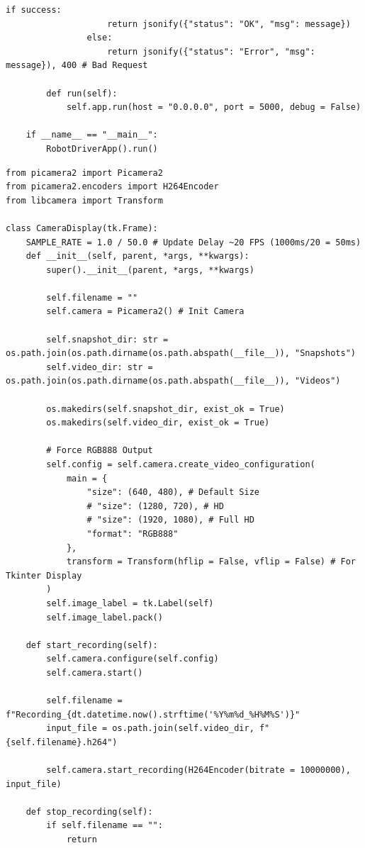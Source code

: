 \documentclass{article}
\begin{document}
\begin{lstlisting}[caption={Robot Driver App}, label={lst:driver_app_code}]
                if success:
                    return jsonify({"status": "OK", "msg": message})
                else:
                    return jsonify({"status": "Error", "msg": message}), 400 # Bad Request

        def run(self):
            self.app.run(host = "0.0.0.0", port = 5000, debug = False)

    if __name__ == "__main__":
        RobotDriverApp().run()
\end{lstlisting}


\begin{lstlisting}[caption={PiCamera Display}, label={lst:picamera_display_code}]
from picamera2 import Picamera2
from picamera2.encoders import H264Encoder
from libcamera import Transform

class CameraDisplay(tk.Frame):
    SAMPLE_RATE = 1.0 / 50.0 # Update Delay ~20 FPS (1000ms/20 = 50ms)
    def __init__(self, parent, *args, **kwargs):
        super().__init__(parent, *args, **kwargs)

        self.filename = ""
        self.camera = Picamera2() # Init Camera

        self.snapshot_dir: str = os.path.join(os.path.dirname(os.path.abspath(__file__)), "Snapshots")
        self.video_dir: str = os.path.join(os.path.dirname(os.path.abspath(__file__)), "Videos")

        os.makedirs(self.snapshot_dir, exist_ok = True)
        os.makedirs(self.video_dir, exist_ok = True)

        # Force RGB888 Output
        self.config = self.camera.create_video_configuration(
            main = {
                "size": (640, 480), # Default Size
                # "size": (1280, 720), # HD
                # "size": (1920, 1080), # Full HD
                "format": "RGB888"
            },
            transform = Transform(hflip = False, vflip = False) # For Tkinter Display
        )
        self.image_label = tk.Label(self)
        self.image_label.pack()

    def start_recording(self):
        self.camera.configure(self.config)
        self.camera.start()

        self.filename = f"Recording_{dt.datetime.now().strftime('%Y%m%d_%H%M%S')}"
        input_file = os.path.join(self.video_dir, f"{self.filename}.h264")

        self.camera.start_recording(H264Encoder(bitrate = 10000000), input_file)

    def stop_recording(self):
        if self.filename == "":
            return


\end{lstlisting}
\end{document}

